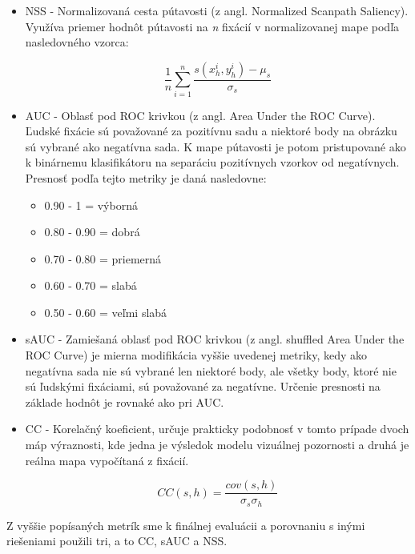 \begin{itemize}

	\item NSS - Normalizovaná cesta pútavosti (z angl. Normalized Scanpath Saliency). Využíva priemer hodnôt pútavosti na \textit{n} fixácií v normalizovanej mape podľa nasledovného vzorca: 
	
	\begin{equation}
	\frac{1}{n} \sum_{i=1}^{n} \frac{s(x_{h}^{i}, y_{h}^{i}) - \mu_{s}}{\sigma _{s}}
	\end{equation}
	
	\item AUC - Oblasť pod ROC krivkou (z angl. Area Under the ROC Curve).
	Ľudské fixácie sú považované za pozitívnu sadu a niektoré body na obrázku sú vybrané ako negatívna sada. K mape pútavosti je potom pristupované ako k binárnemu klasifikátoru na separáciu pozitívnych vzorkov od negatívnych. Presnosť podľa tejto metriky je daná nasledovne: 
	
	\begin{itemize}
		
		\item 0.90 - 1 = výborná
		\item 0.80 - 0.90 = dobrá
		\item 0.70 - 0.80 = priemerná
		\item 0.60 - 0.70 = slabá
		\item 0.50 - 0.60 = veľmi slabá
		
	\end{itemize}
	
	\item sAUC - Zamiešaná oblasť pod ROC krivkou (z angl. shuffled Area Under the ROC Curve) je mierna modifikácia vyššie uvedenej metriky, kedy ako negatívna sada nie sú vybrané len niektoré body, ale všetky body, ktoré nie sú ľudskými fixáciami, sú považované za negatívne. Určenie presnosti na základe hodnôt je rovnaké ako pri AUC. 
	
	\item CC - Korelačný koeficient, určuje prakticky podobnosť v tomto prípade dvoch máp výraznosti, kde jedna je výsledok modelu vizuálnej pozornosti a druhá je reálna mapa vypočítaná z fixácií. 
	
	\begin{equation}
	CC (s, h) = \frac{cov(s, h)}{\sigma_{s} \sigma _{h}}
	\end{equation}
\end{itemize}

Z vyššie popísaných metrík sme k finálnej evaluácii a porovnaniu s inými riešeniami použili tri, a to CC, sAUC a NSS.
  
